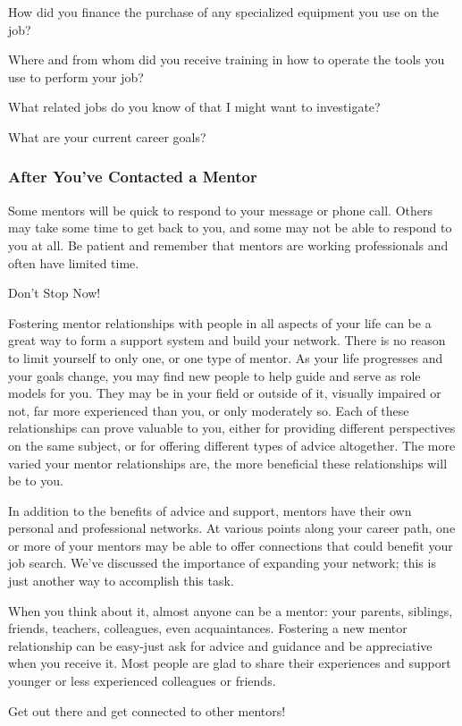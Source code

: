 How did you finance the purchase of any specialized equipment you use on the job?

Where and from whom did you receive training in how to operate the tools you use to perform your job?

What related jobs do you know of that I might want to investigate?

What are your current career goals?

\subsubsection*{After You've Contacted a Mentor}
Some mentors will be quick to respond to your message or phone call. Others may take some time to get back to you, and some may not be able to respond to you at all. Be patient and remember that mentors are working professionals and often have limited time.

Don't Stop Now!

Fostering mentor relationships with people in all aspects of your life can be a great way to form a support system and build your network. There is no reason to limit yourself to only one, or one type of mentor. As your life progresses and your goals change, you may find new people to help guide and serve as role models for you. They may be in your field or outside of it, visually impaired or not, far more experienced than you, or only moderately so. Each of these relationships can prove valuable to you, either for providing different perspectives on the same subject, or for offering different types of advice altogether. The more varied your mentor relationships are, the more beneficial these relationships will be to you.

In addition to the benefits of advice and support, mentors have their own personal and professional networks. At various points along your career path, one or more of your mentors may be able to offer connections that could benefit your job search. We've discussed the importance of expanding your network; this is just another way to accomplish this task.

When you think about it, almost anyone can be a mentor: your parents, siblings, friends, teachers, colleagues, even acquaintances. Fostering a new mentor relationship can be easy-just ask for advice and guidance and be appreciative when you receive it. Most people are glad to share their experiences and support younger or less experienced colleagues or friends.

Get out there and get connected to other mentors!

